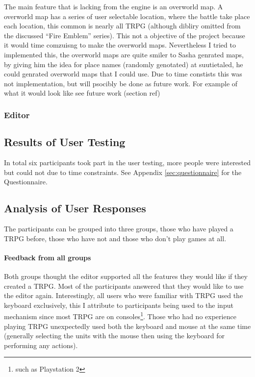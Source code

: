 The main feature that is lacking from the engine is an overworld map. A overworld map has a series of user selectable location, where the battle take place each location, this common is nearly all TRPG (although dibliry omitted from the discussed ``Fire Emblem'' series). This not a objective of the project because it would time comzuisng to make the overworld maps. Nevertheless I tried to implemented this, the overworld maps are quite smiler to  Sasha genrated maps, by giving him the idea for place names (randomly genotated) at suutietaled, he could genrated overworld maps that I could use. Due to time constists this was not implementation, but will psocibly be done as future work. For example of what it would look like see future work (section ref)
\subsubsection{Editor}
\label{ssub:editor}


\subsection{Results of User Testing}
\label{sub:results_of_user_testing}

In total six participants took part in the user testing, more people were interested but could not due to time constraints.  See Appendix \ref{sec:questionnaire} for the Questionnaire.

\subsection{Analysis of User Responses}
The participants can be grouped into three groups, those who have played a TRPG before, those who have not and those who don't play games at all.
\paragraph{Feedback from  all groups\\}
Both groups thought the editor supported all the features they would like if they created a TRPG.  Most of the participants answered that they would like to use the editor again.  Interestingly, all users who were familiar with TRPG used the keyboard exclusively, this I attribute to participants being used to the input mechanism since most TRPG are on consoles\footnote{such as Playstation 2}. Those who had no experience playing TRPG unexpectedly used both the keyboard and mouse at the same time (generally selecting the units with the mouse then using the keyboard for performing any actions).

